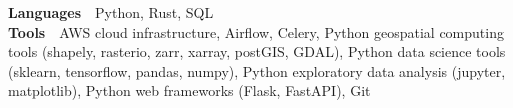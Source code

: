 

\begin{cvparagraph}

\textbf{Languages}~\textemdash~Python, Rust, SQL\\
\textbf{Tools}~\textemdash~AWS cloud infrastructure, Airflow, Celery, Python geospatial computing tools (shapely, rasterio, zarr, xarray, postGIS, GDAL), Python data science tools (sklearn, tensorflow, pandas, numpy), Python exploratory data analysis (jupyter, matplotlib), Python web frameworks (Flask, FastAPI), Git
\end{cvparagraph}